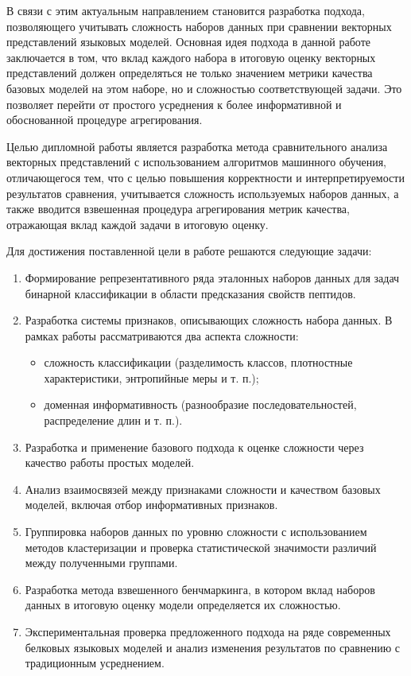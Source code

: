 \documentclass[specification,annotation,times]{itmo-student-thesis}
\begin{document}
В связи с этим актуальным направлением становится разработка подхода, позволяющего учитывать сложность наборов данных при сравнении векторных представлений языковых моделей. Основная идея подхода в данной работе заключается в том, что вклад каждого набора в итоговую оценку векторных представлений должен определяться не только значением метрики качества базовых моделей на этом наборе, но и сложностью соответствующей задачи. Это позволяет перейти от простого усреднения к более информативной и обоснованной процедуре агрегирования.

Целью дипломной работы является разработка метода сравнительного анализа векторных представлений с использованием алгоритмов машинного обучения, отличающегося тем, что с целью повышения корректности и интерпретируемости результатов сравнения, учитывается сложность используемых наборов данных, а также вводится взвешенная процедура агрегирования метрик качества, отражающая вклад каждой задачи в итоговую оценку.

Для достижения поставленной цели в работе решаются следующие задачи:
\begin{enumerate}
    \item Формирование репрезентативного ряда эталонных наборов данных для задач бинарной классификации в области предсказания свойств пептидов.
    \item Разработка системы признаков, описывающих сложность набора данных. В рамках работы рассматриваются два аспекта сложности:
    \begin{itemize}
        \item сложность классификации (разделимость классов, плотностные характеристики, энтропийные меры и т. п.);
        \item доменная информативность (разнообразие последовательностей, распределение длин и т. п.).
    \end{itemize}
    \item Разработка и применение базового подхода к оценке сложности через качество работы простых моделей.
    \item Анализ взаимосвязей между признаками сложности и качеством базовых моделей, включая отбор информативных признаков.
    \item Группировка наборов данных по уровню сложности с использованием методов кластеризации и проверка статистической значимости различий между полученными группами.
    \item Разработка метода взвешенного бенчмаркинга, в котором вклад наборов данных в итоговую оценку модели определяется их сложностью.
    \item Экспериментальная проверка предложенного подхода на ряде современных белковых языковых моделей и анализ изменения результатов по сравнению с традиционным усреднением.
\end{enumerate}
\end{document}
